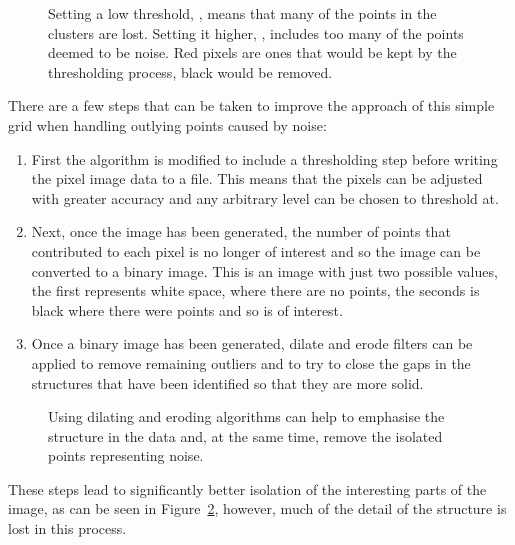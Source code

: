 \begin{figure}[tbhp]
	\caption[Effect of threshold value on clusters identified.]{Setting a low
		threshold, , means that many of the
		points in the clusters are lost. Setting it higher,
		, includes too many of the points
		deemed to be noise. Red pixels are ones that would be kept by the
		thresholding process, black would be removed.}\label{fig:grid-noise}
\end{figure}

There are a few steps that can be taken to improve the approach of this simple
grid when handling outlying points caused by noise:

\begin{enumerate}

	\item First the algorithm is modified to include a thresholding step before
		writing the pixel image data to a file. This means that the pixels can
		be adjusted with greater accuracy and any arbitrary level can be chosen
		to threshold at.

	\item Next, once the image has been generated, the number of points that
		contributed to each pixel is no longer of interest and so the image can
		be converted to a binary image. This is an image with just two possible
		values, the first represents white space, where there are no points,
		the seconds is black where there were points and so is of interest.

	\item Once a binary image has been generated, dilate and erode filters can
		be applied to remove remaining outliers and to try to close the gaps in
		the structures that have been identified so that they are more solid.

\end{enumerate}

\begin{figure}[tbhp]
	\centering

	\caption[Closing algorithm to identify clusters.]{Using dilating and
		eroding algorithms can help to emphasise the structure in the
		data and, at the same time, remove the isolated points representing
		noise.}\label{fig:grid-threshold-close}
\end{figure}

These steps lead to significantly better isolation of the interesting parts of
the image, as can be seen in Figure~\ref{fig:grid-threshold-close}, however,
much of the detail of the structure is lost in this process.
